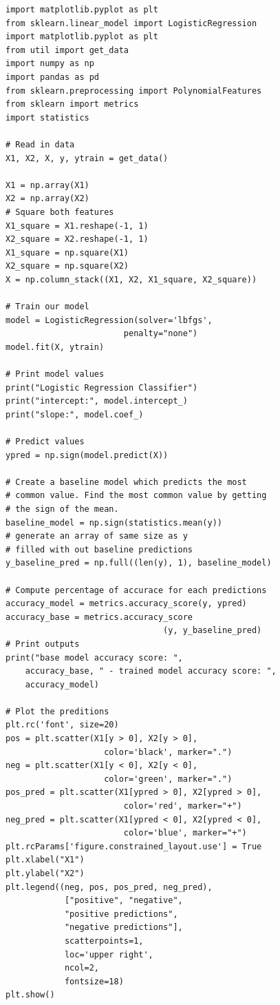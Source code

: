 \documentclass[10pt]{article}
\begin{document}
\begin{lstlisting}
import matplotlib.pyplot as plt
from sklearn.linear_model import LogisticRegression
import matplotlib.pyplot as plt
from util import get_data
import numpy as np
import pandas as pd
from sklearn.preprocessing import PolynomialFeatures
from sklearn import metrics
import statistics

# Read in data
X1, X2, X, y, ytrain = get_data()

X1 = np.array(X1)
X2 = np.array(X2)
# Square both features
X1_square = X1.reshape(-1, 1)
X2_square = X2.reshape(-1, 1)
X1_square = np.square(X1)
X2_square = np.square(X2)
X = np.column_stack((X1, X2, X1_square, X2_square))

# Train our model
model = LogisticRegression(solver='lbfgs',
                        penalty="none")
model.fit(X, ytrain)

# Print model values
print("Logistic Regression Classifier")
print("intercept:", model.intercept_)
print("slope:", model.coef_)

# Predict values
ypred = np.sign(model.predict(X))

# Create a baseline model which predicts the most
# common value. Find the most common value by getting
# the sign of the mean. 
baseline_model = np.sign(statistics.mean(y))
# generate an array of same size as y
# filled with out baseline predictions
y_baseline_pred = np.full((len(y), 1), baseline_model)

# Compute percentage of accurace for each predictions
accuracy_model = metrics.accuracy_score(y, ypred)
accuracy_base = metrics.accuracy_score
                                (y, y_baseline_pred)
# Print outputs
print("base model accuracy score: ",
    accuracy_base, " - trained model accuracy score: ",
    accuracy_model)

# Plot the preditions
plt.rc('font', size=20)
pos = plt.scatter(X1[y > 0], X2[y > 0],
                    color='black', marker=".")
neg = plt.scatter(X1[y < 0], X2[y < 0],
                    color='green', marker=".")
pos_pred = plt.scatter(X1[ypred > 0], X2[ypred > 0],
                        color='red', marker="+")
neg_pred = plt.scatter(X1[ypred < 0], X2[ypred < 0],
                        color='blue', marker="+")
plt.rcParams['figure.constrained_layout.use'] = True
plt.xlabel("X1")
plt.ylabel("X2")
plt.legend((neg, pos, pos_pred, neg_pred),
            ["positive", "negative",
            "positive predictions",
            "negative predictions"],
            scatterpoints=1,
            loc='upper right',
            ncol=2,
            fontsize=18)
plt.show()    
\end{lstlisting}
\end{document}

